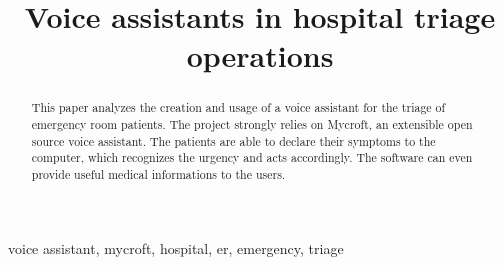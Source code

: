 \documentclass[conference]{IEEEtran}
\begin{document}
\title{Voice assistants in hospital triage operations}

\author{
    \and
    \and
}

\maketitle

\begin{abstract}
    This paper analyzes the creation and usage of a voice assistant for the triage of emergency room patients. The project strongly relies on Mycroft, an extensible open source voice assistant. The patients are able to declare their symptoms to the computer, which recognizes the urgency and acts accordingly. The software can even provide useful medical informations to the users.
\end{abstract}

\begin{IEEEkeywords}
    voice assistant, mycroft, hospital, er, emergency, triage
\end{IEEEkeywords}
\end{document}
